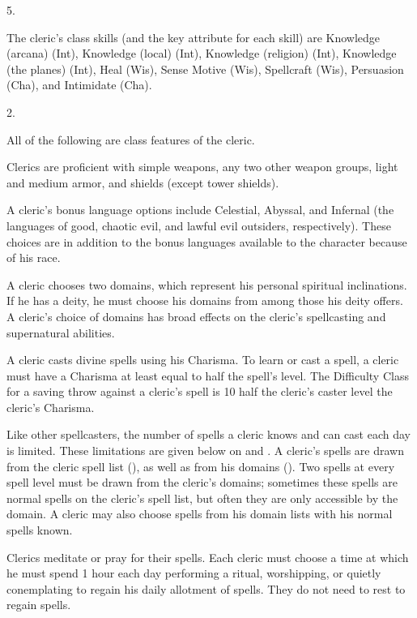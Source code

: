  5.

The cleric's class skills (and the key attribute for each skill) are Knowledge (arcana) (Int), Knowledge (local) (Int), Knowledge (religion) (Int), Knowledge (the planes) (Int), Heal (Wis), Sense Motive (Wis), Spellcraft (Wis), Persuasion (Cha), and Intimidate (Cha).

 2.

All of the following are class features of the cleric.

   Clerics are proficient with simple weapons, any two other weapon groups, light and medium armor, and shields (except tower shields).

 A cleric's bonus language options include Celestial, Abyssal, and Infernal (the languages of good, chaotic evil, and lawful evil outsiders, respectively). These choices are in addition to the bonus languages available to the character because of his race.

 A cleric chooses two domains, which represent his personal spiritual inclinations. If he has a deity, he must choose his domains from among those his deity offers. A cleric's choice of domains has broad effects on the cleric's spellcasting and supernatural abilities.

 A cleric casts divine spells using his Charisma. To learn or cast a spell, a cleric must have a Charisma at least equal to half the spell's level. The Difficulty Class for a saving throw against a cleric's spell is 10 \add half the cleric's caster level \add the cleric's Charisma.

Like other spellcasters, the number of spells a cleric knows and can cast each day is limited. These limitations are given below on  and . A cleric's spells are drawn from the cleric spell list (), as well as from his domains (). Two spells at every spell level must be drawn from the cleric's domains; sometimes these spells are normal spells on the cleric's spell list, but often they are only accessible by the domain. A cleric may also choose spells from his domain lists with his normal spells known.

Clerics meditate or pray for their spells. Each cleric must choose a time at which he must spend 1 hour each day performing a ritual, worshipping, or quietly conemplating to regain his daily allotment of spells. They do not need to rest to regain spells.

